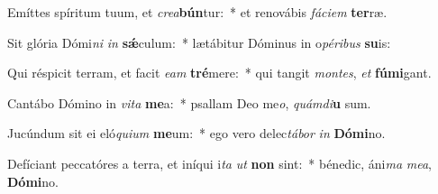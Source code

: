 \item Emíttes spíritum tuum, et \textit{cre}\textit{a}\textbf{bún}tur:~* et renovábis \textit{fá}\textit{ci}\textit{em} \textbf{ter}ræ.
\item Sit glória Dómi\textit{ni} \textit{in} \textbf{sǽ}culum:~* lætábitur Dóminus in o\textit{pé}\textit{ri}\textit{bus} \textbf{su}is:
\item Qui réspicit terram, et facit \textit{e}\textit{am} \textbf{tré}mere:~* qui tangit \textit{mon}\textit{tes}, \textit{et} \textbf{fú}\textbf{mi}gant.
\item Cantábo Dómino in \textit{vi}\textit{ta} \textbf{me}a:~* psallam Deo me\textit{o}, \textit{quám}\textit{di}\textbf{u} sum.
\item Jucúndum sit ei eló\textit{qui}\textit{um} \textbf{me}um:~* ego vero delec\textit{tá}\textit{bor} \textit{in} \textbf{Dó}\textbf{mi}no.
\item Defíciant peccatóres a terra, et iníqui i\textit{ta} \textit{ut} \textbf{non} sint:~* bénedic, áni\textit{ma} \textit{me}\textit{a}, \textbf{Dó}\textbf{mi}no.
